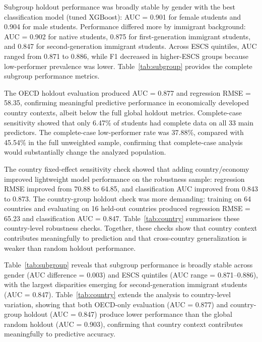 \documentclass[pdflatex,sn-mathphys-ay]{sn-jnl}
\begin{document}
Subgroup holdout performance was broadly stable by gender with the best classification model (tuned XGBoost): AUC = 0.901 for female students and 0.904 for male students. Performance differed more by immigrant background: AUC = 0.902 for native students, 0.875 for first-generation immigrant students, and 0.847 for second-generation immigrant students. Across ESCS quintiles, AUC ranged from 0.871 to 0.886, while F1 decreased in higher-ESCS groups because low-performer prevalence was lower. Table~\ref{tab:subgroup} provides the complete subgroup performance metrics.

The OECD holdout evaluation produced AUC = 0.877 and regression RMSE = 58.35, confirming meaningful predictive performance in economically developed country contexts, albeit below the full global holdout metrics. Complete-case sensitivity showed that only 6.47\% of students had complete data on all 33 main predictors. The complete-case low-performer rate was 37.88\%, compared with 45.54\% in the full unweighted sample, confirming that complete-case analysis would substantially change the analyzed population.

The country fixed-effect sensitivity check showed that adding country/economy improved lightweight model performance on the robustness sample: regression RMSE improved from 70.88 to 64.85, and classification AUC improved from 0.843 to 0.873. The country-group holdout check was more demanding: training on 64 countries and evaluating on 16 held-out countries produced regression RMSE = 65.23 and classification AUC = 0.847. Table~\ref{tab:country} summarises these country-level robustness checks. Together, these checks show that country context contributes meaningfully to prediction and that cross-country generalization is weaker than random holdout performance.



Table~\ref{tab:subgroup} reveals that subgroup performance is broadly stable across gender (AUC difference = 0.003) and ESCS quintiles (AUC range = 0.871--0.886), with the largest disparities emerging for second-generation immigrant students (AUC = 0.847). Table~\ref{tab:country} extends the analysis to country-level variation, showing that both OECD-only evaluation (AUC = 0.877) and country-group holdout (AUC = 0.847) produce lower performance than the global random holdout (AUC = 0.903), confirming that country context contributes meaningfully to predictive accuracy.


\end{document}
